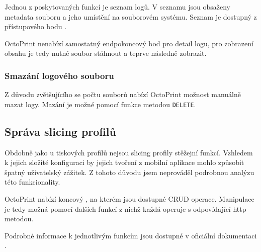 Jednou z poskytovaných funkcí je seznam logů.
V seznamu jsou obsaženy metadata souboru a jeho umístění na souborovém systému.
Seznam je dostupný z přístupového bodu .

OctoPrint nenabízí samostatný endpokoncový bod pro detail logu, pro zobrazení obsahu je tedy nutné soubor stáhnout a teprve následně zobrazit.

\subsubsection*{Smazání logového souboru}

Z důvodu zvětšujícího se počtu souborů nabízí OctoPrint možnost manuálně mazat logy.
Mazání je možné pomocí funkce  metodou \texttt{DELETE}.

\subsection{Správa slicing profilů}

Obdobně jako u tiskových profilů nejsou slicing profily stěžejní funkcí.
Vzhledem k jejich složité konfiguraci by jejich tvoření z mobilní aplikace mohlo způsobit špatný uživatelský zážitek.
Z tohoto důvodu jsem neprováděl podrobnou analýzu této funkcionality.

OctoPrint nabízí koncový , na kterém jsou dostupné CRUD operace.
Manipulace je tedy možná pomocí dalších funkcí z nichž každá operuje s odpovídající \acrshort{http} metodou.

Podrobné informace k jednotlivým funkcím jsou dostupné v oficiální dokumentaci \cite{octoprint-docs-slicing}.
